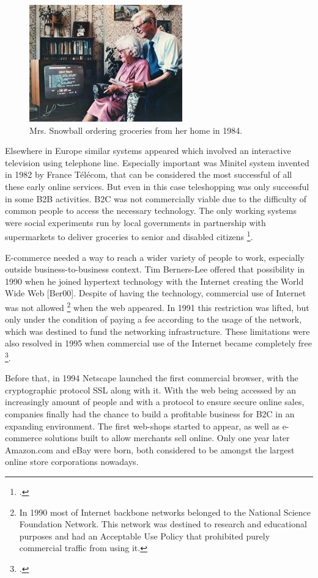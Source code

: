 \begin{figure}[!h]
\center
\includegraphics[keepaspectratio]{images/mrs-snowball-ordering-groceries.png}
\caption{Mrs. Snowball ordering groceries from her home in 1984.}
\label{mrs-snowball-ordering}
\end{figure}

Elsewhere in Europe similar systems appeared which involved an interactive television using telephone line. Especially important was Minitel system invented in 1982 by France Télécom, that can be considered the most successful of all these early online services. But even in this case teleshopping was only successful in some B2B activities. B2C was not commercially viable due to the difficulty of common people to access the necessary technology. The only working systems were social experiments run by local governments in partnership with supermarkets to deliver groceries to senior and disabled citizens \footcite{BB05}.

E-commerce needed a way to reach a wider variety of people to work, especially outside business-to-business context. Tim Berners-Lee offered that possibility in 1990 when he joined hypertext technology with the Internet creating the World Wide Web [Ber00]. Despite of having the technology, commercial use of Internet was not allowed \footnote{In 1990 most of Internet backbone networks belonged to the National Science Foundation Network. This network was destined to research and educational purposes and had an Acceptable Use Policy that prohibited purely commercial traffic from using it.} when the web appeared. In 1991 this restriction was lifted, but only under the condition of paying a fee according to the usage of the network, which was destined to fund the networking infrastructure. These limitations were also resolved in 1995 when commercial use of the Internet became completely free \footcite{Off93}.

Before that, in 1994 Netscape launched the first commercial browser, with the cryptographic protocol SSL along with it. With the web being accessed by an increasingly amount of people and with a protocol to ensure secure online sales, companies finally had the chance to build a profitable business for B2C in an expanding environment. The first web-shops started to appear, as well as e-commerce solutions built to allow merchants sell online. Only one year later Amazon.com and eBay were born, both considered to be amongst the largest online store corporations nowadays.

